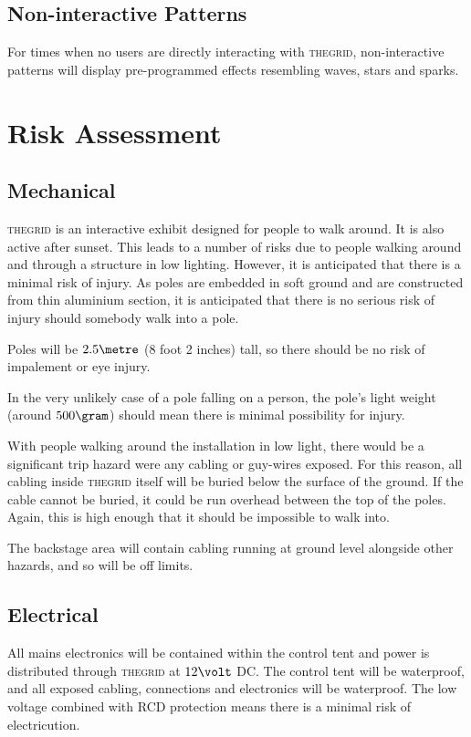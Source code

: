 \documentclass[12pt]{article} %
\newcommand{\thegrid}{\textsc{the\textperiodcentered grid}\xspace}
\begin{document}
\subsection{Non-interactive Patterns}
For times when no users are directly interacting with \thegrid, non-interactive patterns will display pre-programmed effects resembling waves, stars and sparks.

\clearpage
\section{Risk Assessment}
\subsection{Mechanical}
\thegrid is an interactive exhibit designed for people to walk around.  It is also active after sunset.  This leads to a number of risks due to people walking around and through a structure in low lighting.  However, it is anticipated that there is a minimal risk of injury.  As poles are embedded in soft ground and are constructed from thin aluminium section, it is anticipated that there is no serious risk of injury should somebody walk into a pole.

Poles will be $2.5\metre$ (8 foot 2 inches) tall, so there should be no risk of impalement or eye injury.

In the very unlikely case of a pole falling on a person, the pole's light weight (around $500\gram$) should mean there is minimal possibility for injury.

With people walking around the installation in low light, there would be a significant trip hazard were any cabling or guy-wires exposed.  For this reason, all cabling inside \thegrid itself will be buried below the surface of the ground.  If the cable cannot be buried, it could be run overhead between the top of the poles.  Again, this is high enough that it should be impossible to walk into.

The backstage area will contain cabling running at ground level alongside other hazards, and so will be off limits.

\subsection{Electrical}
All mains electronics will be contained within the control tent and power is distributed through \thegrid at $12\volt$ DC.  The control tent will be waterproof, and all exposed cabling, connections and electronics will be waterproof.  The low voltage combined with RCD protection means there is a minimal risk of electricution.
\end{document}
